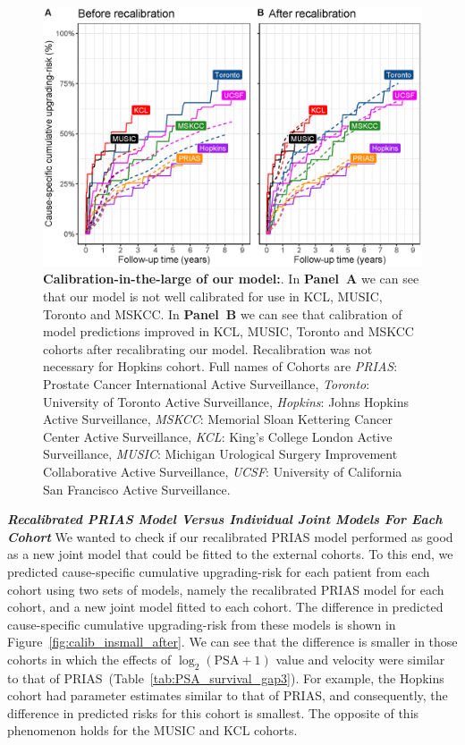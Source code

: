\begin{figure}[!htb]
\centerline{\includegraphics[width=\columnwidth]{images/calib_before_after.eps}}
\caption{\textbf{Calibration-in-the-large of our model:}. In \textbf{Panel~A} we can see that our model is not well calibrated for use in KCL, MUSIC, Toronto and MSKCC. In \textbf{Panel~B} we can see that calibration of model predictions improved in KCL, MUSIC, Toronto and MSKCC cohorts after recalibrating our model. Recalibration was not necessary for Hopkins cohort. Full names of Cohorts are \textit{PRIAS}: Prostate Cancer International Active Surveillance, \textit{Toronto}: University of Toronto Active Surveillance, \textit{Hopkins}: Johns Hopkins Active Surveillance, \textit{MSKCC}: Memorial Sloan Kettering Cancer Center Active Surveillance, \textit{KCL}: King's College London Active Surveillance, \textit{MUSIC}: Michigan Urological Surgery Improvement Collaborative Active Surveillance, \textit{UCSF}: University of California San Francisco Active Surveillance.}
\label{fig:calib_before_after}
\end{figure}

\clearpage
\textbf{\textit{Recalibrated PRIAS Model Versus Individual Joint Models For Each Cohort}}
We wanted to check if our recalibrated PRIAS model performed as good as a new joint model that could be fitted to the external cohorts. To this end, we predicted cause-specific cumulative upgrading-risk for each patient from each cohort using two sets of models, namely the recalibrated PRIAS model for each cohort, and a new joint model fitted to each cohort. The difference in predicted cause-specific cumulative upgrading-risk from these models is shown in Figure~\ref{fig:calib_insmall_after}. We can see that the difference is smaller in those cohorts in which the effects of $\log_2 (\mbox{PSA} + 1)$ value and velocity were similar to that of PRIAS~(Table~\ref{tab:PSA_survival_gap3}). For example, the Hopkins cohort had parameter estimates similar to that of PRIAS, and consequently, the difference in predicted risks for this cohort is smallest. The opposite of this phenomenon holds for the MUSIC and KCL cohorts.
 
